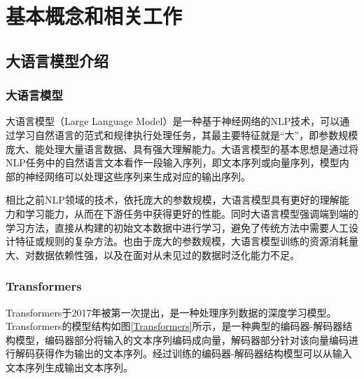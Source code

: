 \documentclass[
    decl-page,  %
    ,fontset = win, %
  ]{njuthesis}
\begin{document}
\chapter{基本概念和相关工作}

\section{大语言模型介绍}
\subsection{大语言模型}
大语言模型（Large Language Model）是一种基于神经网络的NLP技术，可以通过学习自然语言的范式和规律执行处理任务，其最主要特征就是“大”，即参数规模庞大、能处理大量语言数据、具有强大理解能力。大语言模型的基本思想是通过将NLP任务中的自然语言文本看作一段输入序列，即文本序列或向量序列，模型内部的神经网络可以处理这些序列来生成对应的输出序列。

相比之前NLP领域的技术，依托庞大的参数规模，大语言模型具有更好的理解能力和学习能力，从而在下游任务中获得更好的性能。同时大语言模型强调端到端的学习方法，直接从构建的初始文本数据中进行学习，避免了传统方法中需要人工设计特征或规则的复杂方法。也由于庞大的参数规模，大语言模型训练的资源消耗量大、对数据依赖性强，以及在面对从未见过的数据时泛化能力不足。

\subsection{Transformers}
Transformers于2017年被第一次提出\cite{vaswani2017attention}，是一种处理序列数据的深度学习模型。Transformers的模型结构如图\ref{Transformers}所示，是一种典型的编码器-解码器结构模型，编码器部分将输入的文本序列编码成向量，解码器部分针对该向量编码进行解码获得作为输出的文本序列。经过训练的编码器-解码器结构模型可以从输入文本序列生成输出文本序列。
\end{document}
